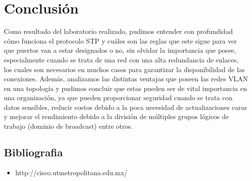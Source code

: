 \documentclass[spanish]{udpreport}
\begin{document}
\chapter{Conclusión}
Como resultado del laboratorio realizado, pudimos entender con profundidad cómo funciona el protocolo STP y cuáles son las reglas que este sigue para ver que puertos van a estar designados o no, sin olvidar la importancia que posee, especialmente cuando se trata de una red con una alta redundancia de enlaces, los cuales son necesarios en muchos casos para garantizar la disponibilidad de las conexiones. Además, analizamos las distintas ventajas que poseen las redes VLAN en una topología y pudimos concluir que estas pueden ser de vital importancia en una organización, ya que pueden proporcionar seguridad cuando se trata con datos sensibles, reducir costos debido a la poca necesidad de actualizaciones caras y mejorar el rendimiento debido a la división de múltiples grupos lógicos de trabajo (dominio de broadcast) entre otros.

\section{Bibliografia}
\begin{itemize}
\item http://cisco.utmetropolitana.edu.mx/
\end{itemize}

\listoffigures
\end{document}
